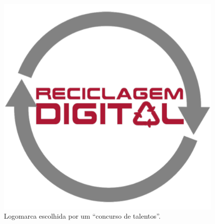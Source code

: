 \documentclass[a4paper]{ifacconf}
\begin{document}
\begin{figure}
	\begin{center}
		\includegraphics[scale=0.1]{figuras/logo-atual-reciclagem-digital-transparente.pdf}    
		\caption{Logomarca escolhida por um ``concurso de talentos''.} 
		\label{fig:logomarca}
	\end{center}
\end{figure}
\end{document}
